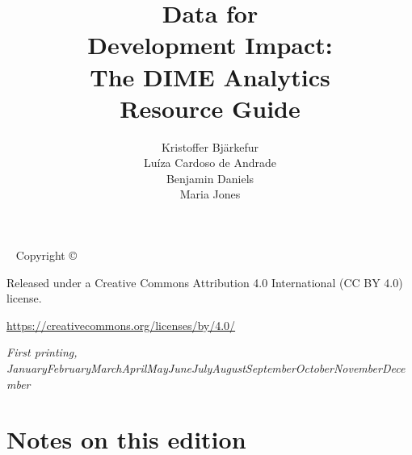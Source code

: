 \documentclass{tufte-book} %
\title{Data for \\ \noindent Development Impact: \\ \bigskip
\noindent The DIME Analytics \\ \noindent Resource Guide} %
\author{Kristoffer Bj{\"a}rkefur \\ \noindent Lu{\'i}za Cardoso de Andrade \\ \noindent Benjamin Daniels \\ \noindent Maria Jones \\} %
\newcommand{\monthyear}{\ifcase\month\or January\or February\or March\or April\or May\or June\or July\or August\or September\or October\or November\or December\fi\space\number\year} %
\begin{document}
\frontmatter



\maketitle %


\newpage
\begin{fullwidth}
~\vfill
\thispagestyle{empty}
\setlength{\parindent}{0pt}
\setlength{\parskip}{\baselineskip}
Copyright \copyright\ \the\year\ \\ \thanklessauthor

\bigskip\par{}

\par{}

\par Released under a Creative Commons Attribution 4.0 International (CC BY 4.0) license.

\url{https://creativecommons.org/licenses/by/4.0/}

\par\textit{First printing, \monthyear}
\end{fullwidth}


\cleardoublepage
\chapter*{Notes on this edition} %



\end{document}
